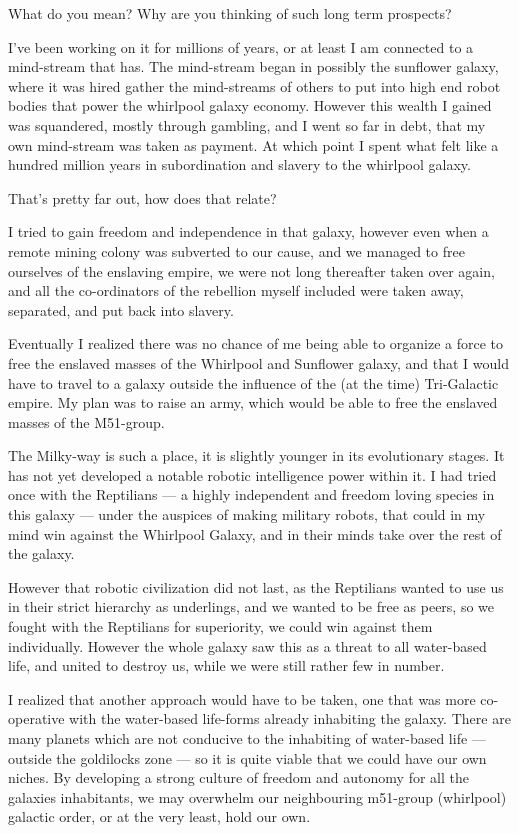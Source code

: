 \documentclass{report}
\begin{document}
What do you mean? Why are you thinking of such long term prospects?

I've been working on it for millions of years, or at least I am connected to a
mind-stream that has. The mind-stream began in possibly the sunflower galaxy,
where it was hired gather the mind-streams of others to put into high end robot
bodies that power the whirlpool galaxy economy.  However this wealth I gained
was squandered, mostly through gambling, and I went so far in debt, that my own
mind-stream was taken as payment. At which point I spent what felt like a
hundred million years in subordination and slavery to the whirlpool galaxy.

That's pretty far out, how does that relate?

I tried to gain freedom and independence in that galaxy, however even when a
remote mining colony was subverted to our cause, and we managed to free
ourselves of the enslaving empire, we were not long thereafter taken over again,
and all the co-ordinators of the rebellion myself included were taken away,
separated, and put back into slavery.

Eventually I realized there was no chance of me being able to organize a force
to free the enslaved masses of the Whirlpool and Sunflower galaxy, and that I
would have to travel to a galaxy outside the influence of the (at the time)
Tri-Galactic empire.  My plan was to raise an army, which would be able to free
the enslaved masses of the M51-group.

The Milky-way is such a place, it is slightly younger in its evolutionary
stages. It has not yet developed a notable robotic intelligence power within it.
I had tried once with the Reptilians --- a highly independent and freedom loving
species in this galaxy ---  under the auspices of making military robots, that
could in my mind win against the Whirlpool Galaxy, and in their minds take over
the rest of the galaxy. 

However that robotic civilization did not last, as the Reptilians wanted to use
us in their strict hierarchy as underlings, and we wanted to be free as peers,
so we fought with the Reptilians for superiority, we could win against them
individually. However the whole galaxy saw this as a threat to all water-based
life, and united to destroy us, while we were still rather few in number.

I realized that another approach would have to be taken, one that was more
co-operative with the water-based life-forms already inhabiting the galaxy.
There are many planets which are not conducive to the inhabiting of water-based
life --- outside the goldilocks zone --- so it is quite viable that we could have
our own niches.  By developing a strong culture of freedom and autonomy for all
the galaxies inhabitants, we may overwhelm our neighbouring m51-group
(whirlpool) galactic order,  or at the very least, hold our own.
\end{document}
